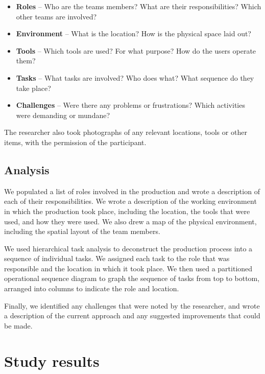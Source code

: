 {\singlespacing
\begin{itemize}
	\item \textbf{Roles} -- Who are the teams members? What are their responsibilities? Which other teams are involved?
	\item \textbf{Environment} -- What is the location? How is the physical space laid out?
	\item \textbf{Tools} -- Which tools are used? For what purpose? How do the users operate them?
	\item \textbf{Tasks} -- What tasks are involved? Who does what? What sequence do they take place?
	\item \textbf{Challenges} -- Were there any problems or frustrations? Which activities were demanding or mundane?
\end{itemize}
}

The researcher also took photographs of any relevant locations, tools or other items, with the permission of the
participant.

\subsection{Analysis}

We populated a list of roles involved in the production and wrote a description of each of their responsibilities. We
wrote a description of the working environment in which the production took place, including the location, the tools
that were used, and how they were used. We also drew a map of the physical environment, including the spatial layout of
the team members.

We used hierarchical task analysis \citep{Kirwan1992,Annett2000} to deconstruct the production process into a sequence
of individual tasks. We assigned each task to the role that was responsible and the location in which it took
place. We then used a partitioned operational sequence diagram \citep{Kirwan1992} to graph the sequence of tasks from
top to bottom, arranged into columns to indicate the role and location.

Finally, we identified any challenges that were noted by the researcher, and wrote a description of the current
approach and any suggested improvements that could be made.

\section{Study results}\label{sec:ethno-results}

